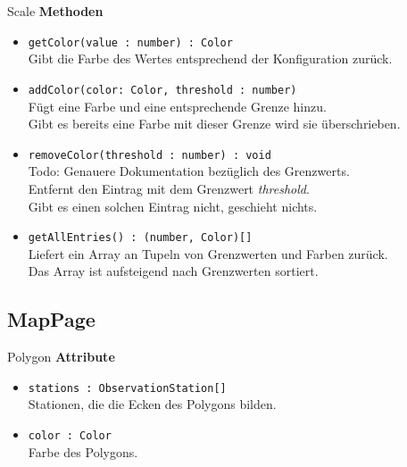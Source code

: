     \begin{Class}{Scale}
        \textbf{Methoden}
        \begin{itemize}
            \item \texttt{getColor(value : number) : Color}
            \\ Gibt die Farbe des Wertes entsprechend der Konfiguration zurück.
            \item \texttt{addColor(color: Color, threshold : number)}
            \\ Fügt eine Farbe und eine entsprechende Grenze hinzu.
            \\ Gibt es bereits eine Farbe mit dieser Grenze wird sie überschrieben.
            \item \texttt{removeColor(threshold : number) : void}
            \\ Todo: Genauere Dokumentation bezüglich des Grenzwerts. 
            \\ Entfernt den Eintrag mit dem Grenzwert \emph{threshold}.
            \\ Gibt es einen solchen Eintrag nicht, geschieht nichts.
            \item \texttt{getAllEntries() : (number, Color)[]}
            \\ Liefert ein Array an Tupeln von Grenzwerten und Farben zurück.
            \\ Das Array ist aufsteigend nach Grenzwerten sortiert.
        \end{itemize}
    \end{Class}

    \subsection{MapPage}

    \begin{Class}{Polygon}
        \textbf{Attribute}
        \begin{itemize}
            \item \texttt{stations : ObservationStation[]}
            \\ Stationen, die die Ecken des Polygons bilden.
            \item \texttt{color : Color}
            \\ Farbe des Polygons.
        \end{itemize}
    \end{Class}

